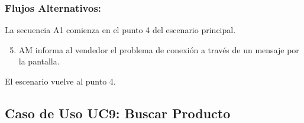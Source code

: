 \begin{framed}
\subsubsection{Flujos Alternativos: }

La secuencia A1 comienza en el punto 4 del escenario principal.
\begin{enumerate}
    \setcounter{enumi}{4}
    \item AM informa al vendedor el problema de conexión a través de un mensaje por la pantalla.
\end{enumerate}
El escenario vuelve al punto 4.

\end{framed}



\subsection{Caso de Uso UC9: Buscar Producto}

